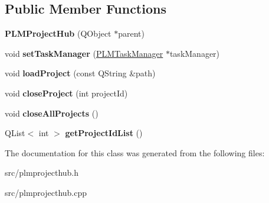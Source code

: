 \subsection*{Public Member Functions}
\begin{DoxyCompactItemize}
\item 
{\bfseries P\+L\+M\+Project\+Hub} (Q\+Object $\ast$parent)\hypertarget{class_p_l_m_project_hub_a84d9d88e629f3a2a7900c2492186449f}{}\label{class_p_l_m_project_hub_a84d9d88e629f3a2a7900c2492186449f}

\item 
void {\bfseries set\+Task\+Manager} (\hyperlink{class_p_l_m_task_manager}{P\+L\+M\+Task\+Manager} $\ast$task\+Manager)\hypertarget{class_p_l_m_project_hub_a91871cb37dd5c4896dc29dd7e947f1a8}{}\label{class_p_l_m_project_hub_a91871cb37dd5c4896dc29dd7e947f1a8}

\item 
void {\bfseries load\+Project} (const Q\+String \&path)\hypertarget{class_p_l_m_project_hub_a764febea4e382622369c183730f6ab04}{}\label{class_p_l_m_project_hub_a764febea4e382622369c183730f6ab04}

\item 
void {\bfseries close\+Project} (int project\+Id)\hypertarget{class_p_l_m_project_hub_acdd01d39a52b87ed4d0a9f1ceb9fd4b9}{}\label{class_p_l_m_project_hub_acdd01d39a52b87ed4d0a9f1ceb9fd4b9}

\item 
void {\bfseries close\+All\+Projects} ()\hypertarget{class_p_l_m_project_hub_a90fa208e20446eccd2d4121fa47226c1}{}\label{class_p_l_m_project_hub_a90fa208e20446eccd2d4121fa47226c1}

\item 
Q\+List$<$ int $>$ {\bfseries get\+Project\+Id\+List} ()\hypertarget{class_p_l_m_project_hub_a7560e5168748c76ddc364c40f105f878}{}\label{class_p_l_m_project_hub_a7560e5168748c76ddc364c40f105f878}

\end{DoxyCompactItemize}


The documentation for this class was generated from the following files\+:\begin{DoxyCompactItemize}
\item 
src/plmprojecthub.\+h\item 
src/plmprojecthub.\+cpp\end{DoxyCompactItemize}

